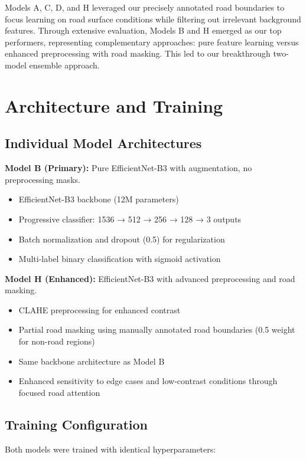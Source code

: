 \documentclass[12pt]{article}
\begin{document}
Models A, C, D, and H leveraged our precisely annotated road boundaries to focus learning on road surface conditions while filtering out irrelevant background features. Through extensive evaluation, Models B and H emerged as our top performers, representing complementary approaches: pure feature learning versus enhanced preprocessing with road masking. This led to our breakthrough two-model ensemble approach.

\section{Architecture and Training}

\subsection{Individual Model Architectures}

\textbf{Model B (Primary):} Pure EfficientNet-B3 with augmentation, no preprocessing masks.
\begin{itemize}[itemsep=1pt,parsep=0pt,topsep=2pt]
\item EfficientNet-B3 backbone (12M parameters)
\item Progressive classifier: 1536 → 512 → 256 → 128 → 3 outputs
\item Batch normalization and dropout (0.5) for regularization
\item Multi-label binary classification with sigmoid activation
\end{itemize}

\textbf{Model H (Enhanced):} EfficientNet-B3 with advanced preprocessing and road masking.
\begin{itemize}[itemsep=1pt,parsep=0pt,topsep=2pt]
\item CLAHE preprocessing for enhanced contrast
\item Partial road masking using manually annotated road boundaries (0.5 weight for non-road regions)
\item Same backbone architecture as Model B
\item Enhanced sensitivity to edge cases and low-contrast conditions through focused road attention
\end{itemize}

\subsection{Training Configuration}

Both models were trained with identical hyperparameters:
\end{document}
